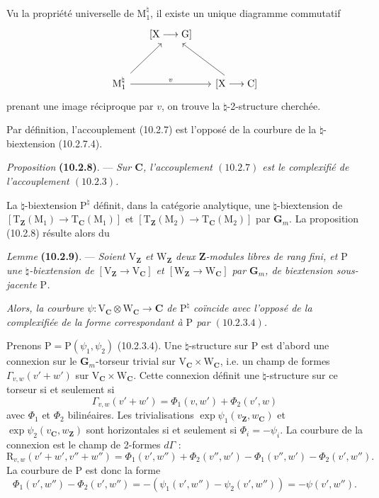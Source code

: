 \documentclass[11pt,leqno]{article}
\begin{document}
Vu la propriété universelle de \(\mathrm{M}_1^{\natural}\),
il existe un unique diagramme commutatif
\[
\begin{tikzcd}[row sep=3em, column sep=1.5em]
& {[\mathrm{X}\longrightarrow\mathrm{G}]} &\\
\mathrm{M}_1^{\natural}
  \arrow[ur] \arrow[rr, "v"]
&& {[\mathrm{X}\longrightarrow\mathrm{C}]} \arrow[ul]
\end{tikzcd}
\]
prenant une image réciproque par \(v\), on trouve la
\(\natural\)-2-structure cherchée.

Par définition, l’accouplement (10.2.7) est l’opposé de la
courbure de la \(\natural\)-biextension (10.2.7.4).

\textit{Proposition} \textbf{(10.2.8)}. — \textit{Sur
\(\mathbf{C}\), l’accouplement \((10.2.7)\) est le complexifié
de l’accouplement \((10.2.3)\).}

La \(\natural\)-biextension \(\mathrm{P}^{\natural}\) définit,
dans la catégorie analytique, une \(\natural\)-biextension de
\([\mathrm{T}_{\mathbf{Z}}(\mathrm{M}_1)\to
\mathrm{T}_{\mathbf{C}}(\mathrm{M}_1)]\) et
\([\mathrm{T}_{\mathbf{Z}}(\mathrm{M}_2)\to
\mathrm{T}_{\mathbf{C}}(\mathrm{M}_2)]\) par \(\mathbf{G}_m\).
La proposition (10.2.8) résulte alors du

\textit{Lemme} \textbf{(10.2.9)}. — \textit{Soient
\(\mathrm{V}_{\mathbf{Z}}\) et \(\mathrm{W}_{\mathbf{Z}}\)
deux \(\mathbf{Z}\)-modules libres de rang fini, et \(\mathrm{P}\)
une \(\natural\)-biextension de
\([\mathrm{V}_{\mathbf{Z}}\to\mathrm{V}_{\mathbf{C}}]\) et
\([\mathrm{W}_{\mathbf{Z}}\to\mathrm{W}_{\mathbf{C}}]\) par
\(\mathbf{G}_m\), de biextension sous-jacente \(\mathrm{P}\).}

\textit{Alors, la courbure
\(\psi:\mathrm{V}_{\mathbf{C}}\otimes\mathrm{W}_{\mathbf{C}}
\to\mathbf{C}\) de \(\mathrm{P}^{\natural}\) coïncide avec
l’opposé de la complexifiée de la forme correspondant à
\(\mathrm{P}\) par \((10.2.3.4)\).}

Prenons \(\mathrm{P}=\mathrm{P}(\psi_1,\psi_2)\) (10.2.3.4).
Une \(\natural\)-structure sur \(\mathrm{P}\) est d’abord une
connexion sur le \(\mathbf{G}_m\)-torseur trivial sur
\(\mathrm{V}_{\mathbf{C}}\times\mathrm{W}_{\mathbf{C}}\),
i.e. un champ de formes \(\Gamma_{v,w}(v'+w')\) sur
\(\mathrm{V}_{\mathbf{C}}\times\mathrm{W}_{\mathbf{C}}\).
Cette connexion définit une \(\natural\)-structure sur ce
torseur si et seulement si
\[
\Gamma_{v,w}(v'+w')=\Phi_1(v,w')+\Phi_2(v',w)
\]
avec \(\Phi_1\) et \(\Phi_2\) bilinéaires.
Les trivialisations \(\exp\psi_1(v_{\mathbf{Z}},w_{\mathbf{C}})\)
et \(\exp\psi_2(v_{\mathbf{C}},w_{\mathbf{Z}})\) sont
horizontales si et seulement si \(\Phi_i=-\psi_i\).
La courbure de la connexion est le champ de 2-formes \(d\Gamma\) :
\[
\mathrm{R}_{v,w}(v'+w',v''+w'')
=\Phi_1(v',w'')+\Phi_2(v'',w')
-\Phi_1(v'',w')-\Phi_2(v',w'').
\]
La courbure de \(\mathrm{P}\) est donc la forme
\[
\Phi_1(v',w'')-\Phi_2(v',w'')
=-(\psi_1(v',w'')-\psi_2(v',w''))
=-\psi(v',w'').
\]
\end{document}
